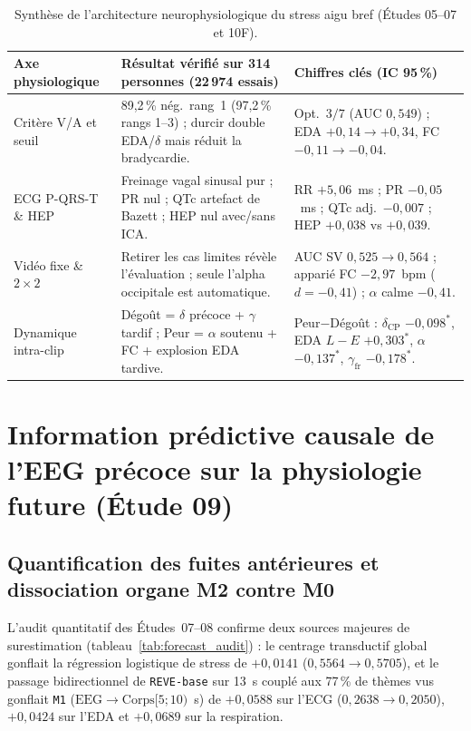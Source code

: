 \documentclass[10pt]{article}
\begin{document}
\begin{table}[t]
\centering\footnotesize
\begin{tabularx}{\linewidth}{@{}L{2.8cm} Y L{4.6cm}@{}}
\toprule
Axe physiologique & Résultat vérifié sur 314 personnes (22\,974 essais) & Chiffres clés (IC 95\,\%)\\
\midrule
Critère V/A et seuil & 89,2\,\% nég.\ rang~1 (97,2\,\% rangs 1--3) ; durcir double EDA/$\delta$ mais réduit la bradycardie. & Opt.\ $3/7$ (AUC $0{,}549$) ; EDA $+0{,}14 \to +0{,}34$, FC $-0{,}11 \to -0{,}04$.\\
ECG P-QRS-T \& HEP & Freinage vagal sinusal pur ; PR nul ; QTc artefact de Bazett ; HEP nul avec/sans ICA. & RR $+5{,}06$~ms ; PR $-0{,}05$~ms ; QTc adj.\ $-0{,}007$ ; HEP $+0{,}038$ vs $+0{,}039$.\\
Vidéo fixe \& $2\times 2$ & Retirer les cas limites révèle l'évaluation ; seule l'alpha occipitale est automatique. & AUC SV $0{,}525 \to 0{,}564$ ; apparié FC $-2{,}97$~bpm ($d=-0{,}41$) ; $\alpha$ calme $-0{,}41$.\\
Dynamique intra-clip & Dégoût = $\delta$ précoce + $\gamma$ tardif ; Peur = $\alpha$ soutenu + FC + explosion EDA tardive. & Peur$-$Dégoût : $\delta_{\text{CP}}$ $-0{,}098^*$, EDA $L-E$ $+0{,}303^*$, $\alpha$ $-0{,}137^*$, $\gamma_{\text{fr}}$ $-0{,}178^*$.\\
\bottomrule
\end{tabularx}
\caption{Synthèse de l'architecture neurophysiologique du stress aigu bref (Études 05--07 et 10F).}
\label{tab:physio}
\end{table}

\section{Information prédictive causale de l'EEG précoce sur la physiologie future (Étude 09)}
\label{sec:forecast}

\subsection{Quantification des fuites antérieures et dissociation organe M2 contre M0}

L'audit quantitatif des Études~07--08 confirme deux sources majeures de surestimation (tableau~\ref{tab:forecast_audit}) : le centrage transductif global gonflait la régression logistique de stress de $+0{,}0141$ ($0{,}5564 \to 0{,}5705$), et le passage bidirectionnel de \texttt{REVE-base} sur 13~s couplé aux 77\,\% de thèmes vus gonflait \texttt{M1} ($\text{EEG} \to \text{Corps}[5 ; 10)$~s) de $+0{,}0588$ sur l'ECG ($0{,}2638 \to 0{,}2050$), $+0{,}0424$ sur l'EDA et $+0{,}0689$ sur la respiration.
\end{document}
